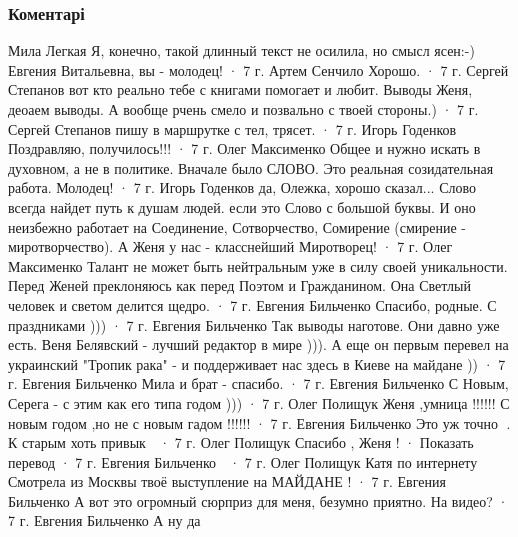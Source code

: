  
 
 
 
 
\subsubsection{Коментарі}
\label{sec:31_12_2013.fb.bilchenko_evgenia.1.doneck_shahter_ermitazh.cmt}

Мила Легкая
Я, конечно, такой длинный текст не осилила, но смысл ясен:-) Евгения Витальевна, вы - молодец!
 · 7 г.
Артем Сенчило
Хорошо.
 · 7 г.
Сергей Степанов
вот кто реально тебе с книгами помогает и любит. Выводы Женя, деоаем выводы. А вообще рчень смело и позвально с твоей стороны.)
 · 7 г.
Сергей Степанов
пишу в маршрутке с тел, трясет.
 · 7 г.
Игорь Годенков
Поздравляю, получилось!!!
 · 7 г.
Олег Максименко
Общее и нужно искать в духовном, а не в политике. Вначале было СЛОВО. Это реальная созидательная работа. Молодец!
 · 7 г.
Игорь Годенков
да, Олежка, хорошо сказал... Слово всегда найдет путь к душам людей. если это Слово с большой буквы. И оно неизбежно работает на Соединение, Сотворчество, Сомирение (смирение - миротворчество). А Женя у нас - класснейший Миротворец!
 · 7 г.
Олег Максименко
Талант не может быть нейтральным уже в силу своей уникальности. Перед Женей преклоняюсь как перед Поэтом и Гражданином. Она Светлый человек и светом делится щедро.
 · 7 г.
Евгения Бильченко
Спасибо, родные. С праздниками )))
 · 7 г.
Евгения Бильченко
Так выводы наготове. Они давно уже есть. Веня Белявский - лучший редактор в мире ))). А еще он первым перевел на украинский "Тропик рака" - и поддерживает нас здесь в Киеве на майдане ))
 · 7 г.
Евгения Бильченко
Мила и брат - спасибо.
 · 7 г.
Евгения Бильченко
С Новым, Серега - с этим как его типа годом )))
 · 7 г.
Олег Полищук
Женя ,умница !!!!!! С новым годом ,но не с новым гадом !!!!!!
 · 7 г.
Евгения Бильченко
Это уж точно 🙂. К старым хоть привык 🙂
 · 7 г.
Олег Полищук
Спасибо , Женя !
 · Показать перевод · 7 г.
Евгения Бильченко
🙂
 · 7 г.
Олег Полищук
Катя по интернету Смотрела из Москвы твоё выступление на МАЙДАНЕ !
 · 7 г.
Евгения Бильченко
А вот это огромный сюрприз для меня, безумно приятно. На видео?
 · 7 г.
Евгения Бильченко
А ну да 🙂


